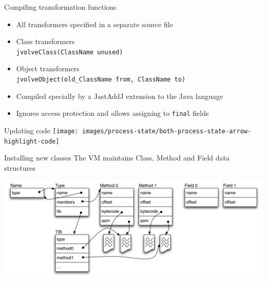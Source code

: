\begin{frame}[t,fragile]{Compiling transformation functions}%
\begin{itemize}
\item All transformers specified in a separate source file
\item Class transformers  \\ \hspace{6ex} {\footnotesize {\tt jvolveClass(ClassName unused)}}
\item Object transformers \\ \hspace{6ex} {\footnotesize {\tt jvolveObject(old\_ClassName from, ClassName to)}}
\item Compiled specially by a JastAddJ extension to the Java language
\item Ignores access protection and allows assigning to {\tt final} fields
\end{itemize}
\end{frame}



\begin{frame}{Updating code}%
\vspace*{-1mm}%
\hspace*{1mm}%
\texttt{[image: images/process-state/both-process-state-arrow-highlight-code]}%
\end{frame}

\begin{frame}[t,fragile,label=classload]{Installing new classes}%
The VM maintains Class, Method and Field data structures
\begin{center}
\includegraphics[scale=0.40]{images/vm-meta-data/vm-meta-data}%
\end{center}
\end{frame}

